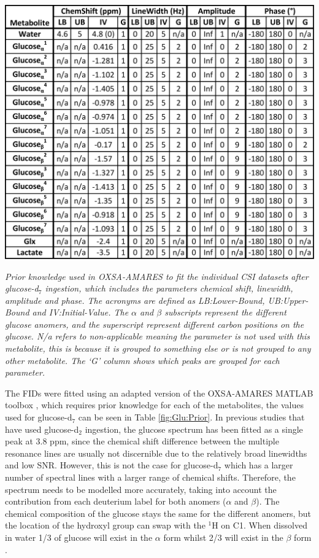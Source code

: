 \begin{table}[H]
    \centering
    \includegraphics[width = 1\textwidth]{Figures/Glucose/Prior_Table.png}
    \caption{\textit{Prior knowledge used in OXSA-AMARES \cite{Vanhamme1997ImprovedKnowledge, Purvis2017OXSA:MATLAB} to fit the individual \ac{CSI} datasets after glucose-d$_7$ ingestion, which includes the parameters chemical shift, linewidth, amplitude and phase. The acronyms are defined as LB:Lower-Bound, UB:Upper-Bound and IV:Initial-Value. The $\alpha$ and $\beta$ subscripts represent the different glucose anomers, and the superscript represent different carbon positions on the glucose. N/a refers to non-applicable meaning the parameter is not used with this metabolite, this is because it is grouped to something else or is not grouped to any other metabolite. The `G' column shows which peaks are grouped for each parameter.}}
    \label{fig:Glu:Prior}
\end{table}

The \ac{FID}s were fitted using an adapted version of the OXSA-AMARES MATLAB toolbox \cite{Vanhamme1997ImprovedKnowledge, Purvis2017OXSA:MATLAB}, which requires prior knowledge for each of the metabolites, the values used for glucose-d$_7$ can be seen in Table \ref{fig:Glu:Prior}. In previous studies that have used glucose-d$_2$ ingestion, the glucose spectrum has been fitted as a single peak at 3.8 ppm, since the chemical shift difference between the multiple resonance lines are usually not discernible due to the relatively broad linewidths and low SNR. However, this is not the case for glucose-d$_7$ \cite{Govindaraju2000ProtonMetabolites} which has a larger number of spectral lines with a larger range of chemical shifts. Therefore, the spectrum needs to be modelled more accurately, taking into account the contribution from each deuterium label for both anomers ($\alpha$ and $\beta$). The chemical composition of the glucose stays the same for the different anomers, but the location of the hydroxyl group can swap with the $^1$H on C1. When dissolved in water 1/3 of glucose will exist in the $\alpha$ form whilst 2/3 will exist in the $\beta$ form \cite{Leitch2009-Erythrocytes}.

